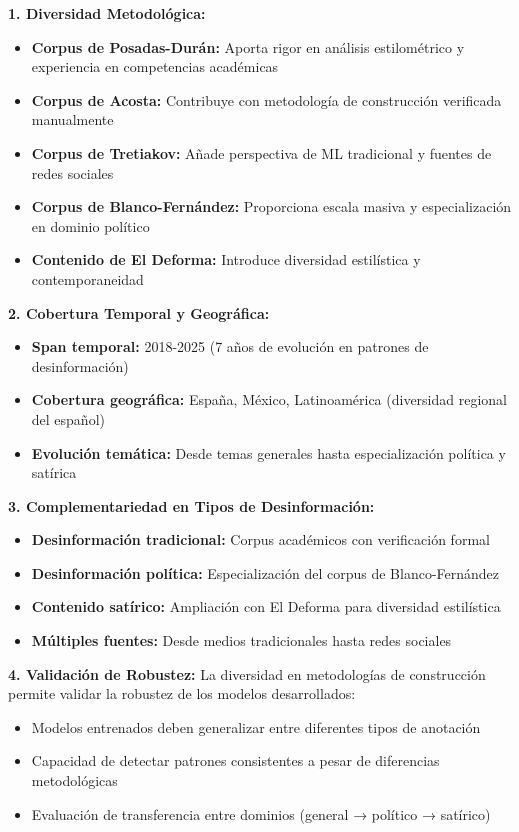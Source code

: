 \textbf{1. Diversidad Metodológica:}
\begin{itemize}
    \item \textbf{Corpus de Posadas-Durán:} Aporta rigor en análisis estilométrico y experiencia en competencias académicas
    \item \textbf{Corpus de Acosta:} Contribuye con metodología de construcción verificada manualmente
    \item \textbf{Corpus de Tretiakov:} Añade perspectiva de ML tradicional y fuentes de redes sociales
    \item \textbf{Corpus de Blanco-Fernández:} Proporciona escala masiva y especialización en dominio político
    \item \textbf{Contenido de El Deforma:} Introduce diversidad estilística y contemporaneidad
\end{itemize}

\textbf{2. Cobertura Temporal y Geográfica:}
\begin{itemize}
    \item \textbf{Span temporal:} 2018-2025 (7 años de evolución en patrones de desinformación)
    \item \textbf{Cobertura geográfica:} España, México, Latinoamérica (diversidad regional del español)
    \item \textbf{Evolución temática:} Desde temas generales hasta especialización política y satírica
\end{itemize}

\textbf{3. Complementariedad en Tipos de Desinformación:}
\begin{itemize}
    \item \textbf{Desinformación tradicional:} Corpus académicos con verificación formal
    \item \textbf{Desinformación política:} Especialización del corpus de Blanco-Fernández
    \item \textbf{Contenido satírico:} Ampliación con El Deforma para diversidad estilística
    \item \textbf{Múltiples fuentes:} Desde medios tradicionales hasta redes sociales
\end{itemize}

\textbf{4. Validación de Robustez:}
La diversidad en metodologías de construcción permite validar la robustez de los modelos desarrollados:
\begin{itemize}
    \item Modelos entrenados deben generalizar entre diferentes tipos de anotación
    \item Capacidad de detectar patrones consistentes a pesar de diferencias metodológicas
    \item Evaluación de transferencia entre dominios (general → político → satírico)
\end{itemize}

